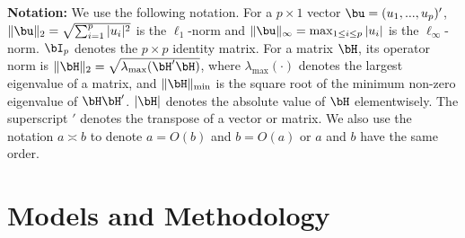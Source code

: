 {\bf Notation:}  We use the following notation. For a $p\times 1$ vector
$\bu=(u_1,..., u_p)'$, $\|\bu\|_2=\sqrt{\sum_{i=1}^p|u_i|^2}$ is the $\ell_1$-norm and $\|\bu\|_\infty=\max_{1\leq i\leq p}|u_i|$ is the $\ell_\infty$-norm. $\bI_p$ denotes the $p\times p$ identity matrix. For a matrix $\bH$, its operator norm is $\|\bH
\|_2=\sqrt{\lambda_{\max} (\bH' \bH ) }$, where
$\lambda_{\max} (\cdot) $ denotes the largest eigenvalue of a matrix, and $\|\bH\|_{\min}$ is the square root of the minimum non-zero eigenvalue of $\bH\bH'$. $|\bH|$ denotes the absolute value of $\bH$ elementwisely. The superscript ${'}$ denotes the 
transpose of a vector or matrix. We also use the notation $a\asymp b$ to denote $a=O(b)$ and $b=O(a)$ or $a$ and $b$ have the same order.


		
		\section{Models and Methodology} \label{sec2}
		
